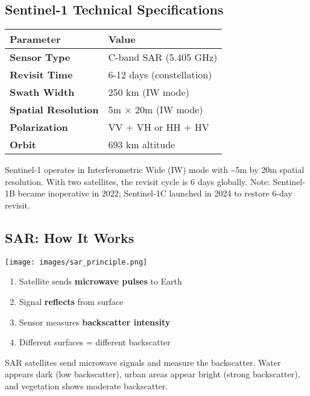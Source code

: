 \documentclass[
  letterpaper,
  DIV=11,
  numbers=noendperiod]{scrartcl}
\providecommand{\tightlist}{%
  \setlength{\itemsep}{0pt}\setlength{\parskip}{0pt}}
\begin{document}
\subsection{Sentinel-1 Technical
Specifications}\label{sentinel-1-technical-specifications}

\begin{longtable}[]{@{}ll@{}}
\toprule\noalign{}
\textbf{Parameter} & \textbf{Value} \\
\midrule\noalign{}
\endhead
\bottomrule\noalign{}
\endlastfoot
\textbf{Sensor Type} & C-band SAR (5.405 GHz) \\
\textbf{Revisit Time} & 6-12 days (constellation) \\
\textbf{Swath Width} & 250 km (IW mode) \\
\textbf{Spatial Resolution} & 5m × 20m (IW mode) \\
\textbf{Polarization} & VV + VH or HH + HV \\
\textbf{Orbit} & 693 km altitude \\
\end{longtable}

Sentinel-1 operates in Interferometric Wide (IW) mode with
\textasciitilde5m by 20m spatial resolution. With two satellites, the
revisit cycle is 6 days globally. Note: Sentinel-1B became inoperative
in 2022; Sentinel-1C launched in 2024 to restore 6-day revisit.

\subsection{SAR: How It Works}\label{sar-how-it-works}

\begin{center}
\texttt{[image: images/sar\_principle.png]}
\end{center}

\begin{enumerate}
\def\labelenumi{\arabic{enumi}.}
\tightlist
\item
  Satellite sends \textbf{microwave pulses} to Earth
\item
  Signal \textbf{reflects} from surface
\item
  Sensor measures \textbf{backscatter intensity}
\item
  Different surfaces = different backscatter
\end{enumerate}

SAR satellites send microwave signals and measure the backscatter. Water
appears dark (low backscatter), urban areas appear bright (strong
backscatter), and vegetation shows moderate backscatter.
\end{document}
